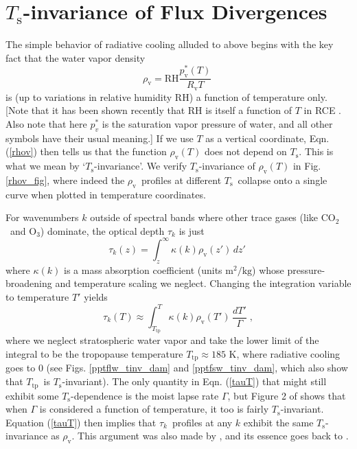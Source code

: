 \documentclass[10pt]{article}
\newcommand{\beqn}{\begin{equation}}
\newcommand{\eeqn}{\end{equation}}
\newcommand{\eqnref}[1]{(\ref{#1})}
\newcommand{\cotwo}{\ensuremath{\mathrm{CO_2}}}
\newcommand{\othree}{\ensuremath{\mathrm{O_3}}}
\newcommand{\tauk}{\ensuremath{\tau_k}}
\newcommand{\rhov}{\ensuremath{\rho_\mathrm{v}}}
\newcommand{\Rv}{\ensuremath{R_\mathrm{v}}}
\newcommand{\pvstar}{\ensuremath{p^*_{\mathrm{v}}}}
\newcommand{\Ts}{\ensuremath{T_\mathrm{s}}}
\newcommand{\RH}{\ensuremath{\mathrm{RH}}}
\newcommand{\Ttp}{\ensuremath{T_\mathrm{tp}}}
\begin{document}
\section{\Ts-invariance of Flux Divergences}
\label{Ts_invariance}
The simple behavior of radiative cooling alluded to above begins with the key fact that  the water vapor density 
	\beqn
		\rhov =  \RH\frac{\pvstar(T)}{\Rv T} \; 
	\label{rhov}
	\eeqn
	 is (up to variations in relative humidity \RH) a function of temperature only. [Note that it has been shown recently that RH is itself a function of $T$ in RCE \citep{romps2014}. Also note that here $p_v^*$  is the saturation vapor pressure of water, and all other symbols have their usual meaning.] If we use $T$ as a vertical coordinate,  Eqn. \eqnref{rhov} then tells us that the function $\rhov(T)$ does not depend on \Ts. This is what we mean by `\Ts-invariance'. We verify \Ts-invariance of $\rhov(T)$  in Fig. \ref{rhov_fig}, where indeed  the \rhov\ profiles at different \Ts\ collapse onto a single curve when plotted in temperature coordinates.
	 
	For wavenumbers $k$ outside of spectral bands where other trace gases (like \cotwo\ and \othree) dominate, the optical depth $\tauk$ is just
	\beqn
		\tau_k(z) = \int_z^\infty \kappa(k)  \rhov(z') \, dz'  \; 
		\label{tauz}
	\eeqn
		where $\kappa(k)$ is a  mass absorption coefficient  (units $\mathrm{m^2/kg}$) whose pressure-broadening and temperature scaling we neglect. Changing the integration variable to temperature $T'$ yields
		\beqn
		\tau_k(T) \approx \int_{\Ttp}^T \kappa(k)  \rhov(T') \, \frac{dT'}{\Gamma}  \; ,
		\label{tauT}
	\eeqn
	where we neglect stratospheric water vapor and take the lower limit of the integral to be the tropopause temperature $\Ttp \approx 185$ K, where radiative cooling goes to 0 (see Figs. \ref{pptflw_tinv_dam} and  \ref{pptfsw_tinv_dam}, which also show that \Ttp\ is \Ts-invariant). The only quantity in Eqn. \eqnref{tauT} that might still exhibit some \Ts-dependence is the  moist lapse rate $\Gamma$, but Figure 2 of \cite{ingram2010} shows that when $\Gamma$ is considered a function of temperature, it too is fairly  \Ts-invariant. Equation \eqnref{tauT} then implies that \tauk\ profiles at any $k$ exhibit the same \Ts-invariance as \rhov. This argument was also made by \cite{ingram2010}, and its essence goes back to  \cite{simpson1928}.
	
\end{document}
